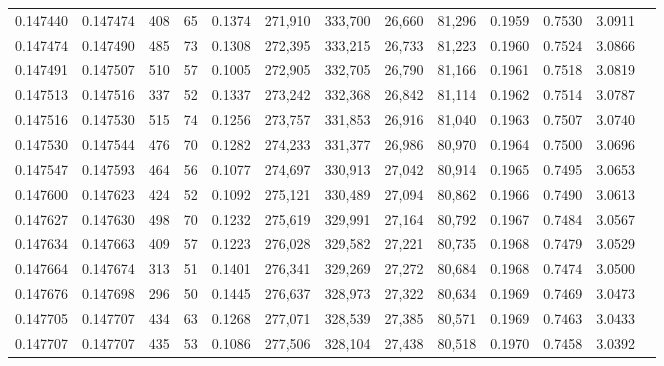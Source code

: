 \begin{tabular}{rrrrrrrrrrrrr}
0.147440 & 0.147474 &   408 &  65 &                                     0.1374 & 271,910 & 333,700 &  26,660 &  81,296 & 0.1959 & 0.7530 & 3.0911 \\
0.147474 & 0.147490 &   485 &  73 &                                     0.1308 & 272,395 & 333,215 &  26,733 &  81,223 & 0.1960 & 0.7524 & 3.0866 \\
0.147491 & 0.147507 &   510 &  57 &                                     0.1005 & 272,905 & 332,705 &  26,790 &  81,166 & 0.1961 & 0.7518 & 3.0819 \\
0.147513 & 0.147516 &   337 &  52 &                                     0.1337 & 273,242 & 332,368 &  26,842 &  81,114 & 0.1962 & 0.7514 & 3.0787 \\
0.147516 & 0.147530 &   515 &  74 &                                     0.1256 & 273,757 & 331,853 &  26,916 &  81,040 & 0.1963 & 0.7507 & 3.0740 \\
0.147530 & 0.147544 &   476 &  70 &                                     0.1282 & 274,233 & 331,377 &  26,986 &  80,970 & 0.1964 & 0.7500 & 3.0696 \\
0.147547 & 0.147593 &   464 &  56 &                                     0.1077 & 274,697 & 330,913 &  27,042 &  80,914 & 0.1965 & 0.7495 & 3.0653 \\
0.147600 & 0.147623 &   424 &  52 &                                     0.1092 & 275,121 & 330,489 &  27,094 &  80,862 & 0.1966 & 0.7490 & 3.0613 \\
0.147627 & 0.147630 &   498 &  70 &                                     0.1232 & 275,619 & 329,991 &  27,164 &  80,792 & 0.1967 & 0.7484 & 3.0567 \\
0.147634 & 0.147663 &   409 &  57 &                                     0.1223 & 276,028 & 329,582 &  27,221 &  80,735 & 0.1968 & 0.7479 & 3.0529 \\
0.147664 & 0.147674 &   313 &  51 &                                     0.1401 & 276,341 & 329,269 &  27,272 &  80,684 & 0.1968 & 0.7474 & 3.0500 \\
0.147676 & 0.147698 &   296 &  50 &                                     0.1445 & 276,637 & 328,973 &  27,322 &  80,634 & 0.1969 & 0.7469 & 3.0473 \\
0.147705 & 0.147707 &   434 &  63 &                                     0.1268 & 277,071 & 328,539 &  27,385 &  80,571 & 0.1969 & 0.7463 & 3.0433 \\
0.147707 & 0.147707 &   435 &  53 &                                     0.1086 & 277,506 & 328,104 &  27,438 &  80,518 & 0.1970 & 0.7458 & 3.0392 \\

\end{tabular}
